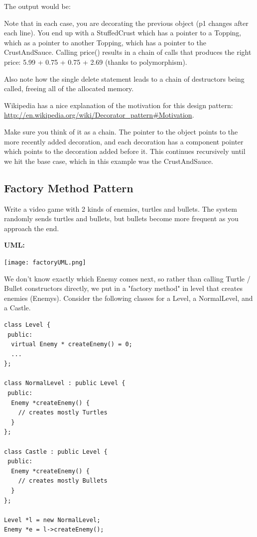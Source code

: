 \documentclass[english, 11pt]{article}
\begin{document}
\begin{exmp}
The output would be: 

Note that in each case, you are decorating the previous object (p1 changes after each line). You end up with a StuffedCrust which has a pointer to a Topping, which as a pointer to another Topping, which has a pointer to the CrustAndSauce. Calling price() results in a chain of calls that produces the right price:  5.99 + 0.75 + 0.75 + 2.69   (thanks to polymorphism).

Also note how the single delete statement leads to a chain of destructors being called, freeing all of the allocated memory.

Wikipedia has a nice explanation of the motivation for this design pattern: \url{http://en.wikipedia.org/wiki/Decorator_pattern#Motivation}.

\begin{note}
  Make sure you think of it as a chain. The pointer to the object points to the more recently added decoration, and each decoration has a component pointer which points to the decoration added before it. This continues recursively until we hit the base case, which in this example was the CrustAndSauce.
\end{note}

\end{exmp}

\subsection{Factory Method Pattern}

\begin{exmp}
  Write a video game with 2 kinds of enemies, turtles and bullets. The system randomly sends turtles and bullets, but bullets become more frequent as you approach the end.
\end{exmp}

\textbf{UML:}
\begin{center}
  \texttt{[image: factoryUML.png]}
\end{center}

We don't know exactly which Enemy comes next, so rather than calling Turtle / Bullet constructors directly, we put in a "factory method" in level that creates enemies (Enemys). Consider the following classes for a Level, a NormalLevel, and a Castle.

\begin{lstlisting}
class Level {
 public:
  virtual Enemy * createEnemy() = 0;
  ...
};

class NormalLevel : public Level {
 public:
  Enemy *createEnemy() {
    // creates mostly Turtles
  }
};

class Castle : public Level {
 public:
  Enemy *createEnemy() {
    // creates mostly Bullets
  }
};

Level *l = new NormalLevel;
Enemy *e = l->createEnemy();
\end{lstlisting}
\end{document}

